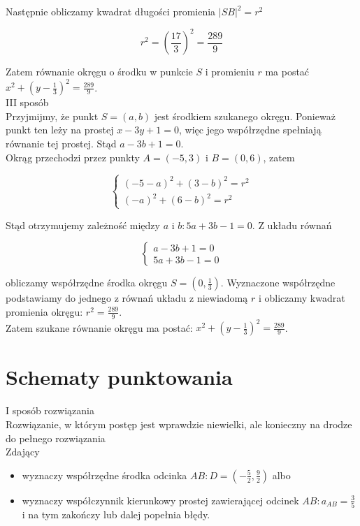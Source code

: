 \documentclass[10pt]{article}
\begin{document}
Następnie obliczamy kwadrat długości promienia $|S B|^{2}=r^{2}$

$$
r^{2}=\left(\frac{17}{3}\right)^{2}=\frac{289}{9}
$$

Zatem równanie okręgu o środku w punkcie $S$ i promieniu $r$ ma postać $x^{2}+\left(y-\frac{1}{3}\right)^{2}=\frac{289}{9}$.\\
III sposób\\
Przyjmijmy, że punkt $S=(a, b)$ jest środkiem szukanego okręgu. Ponieważ punkt ten leży na prostej $x-3 y+1=0$, więc jego współrzędne spełniają równanie tej prostej. Stąd $a-3 b+1=0$.\\
Okrąg przechodzi przez punkty $A=(-5,3)$ i $B=(0,6)$, zatem

$$
\left\{\begin{array}{l}
(-5-a)^{2}+(3-b)^{2}=r^{2} \\
(-a)^{2}+(6-b)^{2}=r^{2}
\end{array}\right.
$$

Stąd otrzymujemy zależność między $a$ i $b: 5 a+3 b-1=0$. Z układu równań

$$
\left\{\begin{array}{l}
a-3 b+1=0 \\
5 a+3 b-1=0
\end{array}\right.
$$

obliczamy współrzędne środka okręgu $S=\left(0, \frac{1}{3}\right)$. Wyznaczone współrzędne podstawiamy do jednego z równań układu z niewiadomą $r$ i obliczamy kwadrat promienia okręgu: $r^{2}=\frac{289}{9}$.\\
Zatem szukane równanie okręgu ma postać: $x^{2}+\left(y-\frac{1}{3}\right)^{2}=\frac{289}{9}$.

\section*{Schematy punktowania}
I sposób rozwiązania\\
Rozwiązanie, w którym postęp jest wprawdzie niewielki, ale konieczny na drodze do pełnego rozwiązania\\
Zdający

\begin{itemize}
  \item wyznaczy współrzędne środka odcinka $A B: D=\left(-\frac{5}{2}, \frac{9}{2}\right)$ albo
  \item wyznaczy współczynnik kierunkowy prostej zawierającej odcinek $A B: a_{A B}=\frac{3}{5}$ i na tym zakończy lub dalej popełnia błędy.
\end{itemize}
\end{document}
